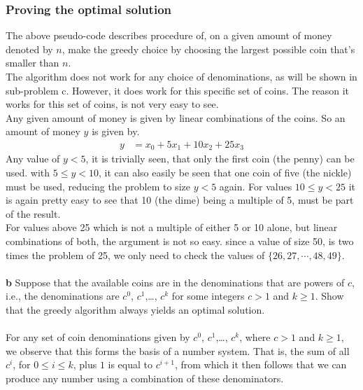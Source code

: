 \documentclass[11pt,english]{article}
\begin{document}
\subsubsection*{Proving the optimal solution}
\noindent The above pseudo-code describes procedure of, on a given amount 
of money denoted by $n$, make the greedy choice by choosing the largest 
possible coin that's smaller than $n$. \\
The algorithm does not work for any choice of denominations, as will be 
shown in sub-problem c. However, it does work for this specific set of 
coins. The reason it works for this set of coins, is not very easy to 
see. \\
Any given amount of money is given by linear combinations of the coins. 
So an amount of money $y$ is given by.
\begin{align*}
y &= x_0 + 5x_1 + 10x_2 +25x_3
\end{align*}
Any value of $y < 5$, it is trivially seen, that only the first coin (the
penny) can be used. with $5 \leq y < 10$, it can also easily be seen that
one coin of five (the nickle) must be used, reducing the problem to size
$y < 5$ again. For values $10 \leq y < 25$ it is again pretty easy to see
that 10 (the dime) being a multiple of 5, must be part of the result. \\
For values above 25 which is not a multiple of either 5 or 10 alone, but 
linear combinations of both, the argument is not so easy. since a value 
of size 50, is two times the problem of 25, we only need to check the 
values of $\{ 26, 27, \cdots, 48, 49 \}$.
\\\\
\noindent \large{\textbf{b} Suppose that the available coins are in the
denominations that are powers of $c$, i.e., the denominations are $c^0$,
$c^1$,\dots, $c^k$ for some integers $c > 1$ and $k \geq 1$. Show that
the greedy algorithm always yields an optimal solution.}
\\\\
For any set of coin denominations given by $c^0$, $c^1$,\dots, $c^k$, where
$c > 1$ and $k \geq 1$, we observe that this forms the basis of a number
system. That is, the sum of all $c^i$, for $0 \leq i \leq k$, plus $1$ is
equal to $c^{i+1}$, from which it then follows that we can produce any number
using a combination of these denominators.
\end{document}
